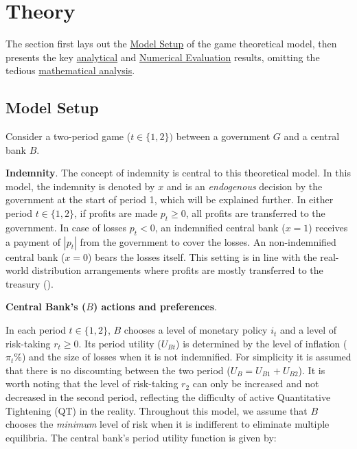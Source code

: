 \documentclass[
  a4paper,
  abstract=true]{scrartcl}
\theoremstyle{definition}
\begin{document}
\section{Theory}\label{sec-theory}

The section first lays out the \hyperref[model-setup]{Model Setup} of
the game theoretical model, then presents the key
\hyperref[sec-analytical-main]{analytical} and
\hyperref[sec-simulation]{Numerical Evaluation} results, omitting the
tedious \hyperref[sec-model-app]{mathematical analysis}.

\subsection{Model Setup}\label{model-setup}

Consider a two-period game (\(t\in\{1,2\})\) between a government \(G\)
and a central bank \(B\).

\textbf{Indemnity}. The concept of indemnity is central to this
theoretical model. In this model, the indemnity is denoted by \(x\) and
is an \emph{endogenous} decision by the government at the start of
period 1, which will be explained further. In either period
\(t\in\{1,2\}\), if profits are made \(p_t\geq0\), all profits are
transferred to the government. In case of losses \(p_t<0\), an
indemnified central bank (\(x=1\)) receives a payment of \(|p_t|\) from
the government to cover the losses. An non-indemnified central bank
(\(x=0\)) bears the losses itself. This setting is in line with the
real-world distribution arrangements where profits are mostly
transferred to the treasury ().

\textbf{Central Bank's (}\(B\)\textbf{) actions and preferences}.

In each period \(t\in\{1,2\}\), \(B\) chooses a level of monetary policy
\(i_t\) and a level of risk-taking \(r_t\geq0\). Its period utility
(\(U_{Bt}\)) is determined by the level of inflation (\(\pi_t\%\)) and
the size of losses when it is not indemnified. For simplicity it is
assumed that there is no discounting between the two period
(\(U_B=U_{B1}+U_{B2}\)). It is worth noting that the level of
risk-taking \(r_2\) can only be increased and not decreased in the
second period, reflecting the difficulty of active Quantitative
Tightening (QT) in the reality. Throughout this model, we assume that
\(B\) chooses the \emph{minimum} level of risk when it is indifferent to
eliminate multiple equilibria. The central bank's period utility
function is given by:
\end{document}
